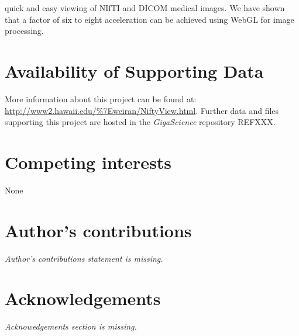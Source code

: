 \documentclass[twocolumn]{bmcart}%
\begin{document}
quick and easy viewing of NIfTI and DICOM medical images. We have shown
that a factor of six to eight acceleration can be achieved using WebGL
for image processing.


\begin{backmatter}

\section*{Availability of Supporting Data}
More information about this project can be found at: \url{http://www2.hawaii.edu/\%7Eweiran/NiftyView.html}. Further data and files supporting this project are hosted in the \emph{GigaScience} repository REFXXX.

\section*{Competing interests}
None

\section*{Author's contributions}
\emph{Author's contributions statement is missing.}

\section*{Acknowledgements}
\emph{Acknowedgements section is missing.}

  
  


\end{backmatter}
\end{document}

